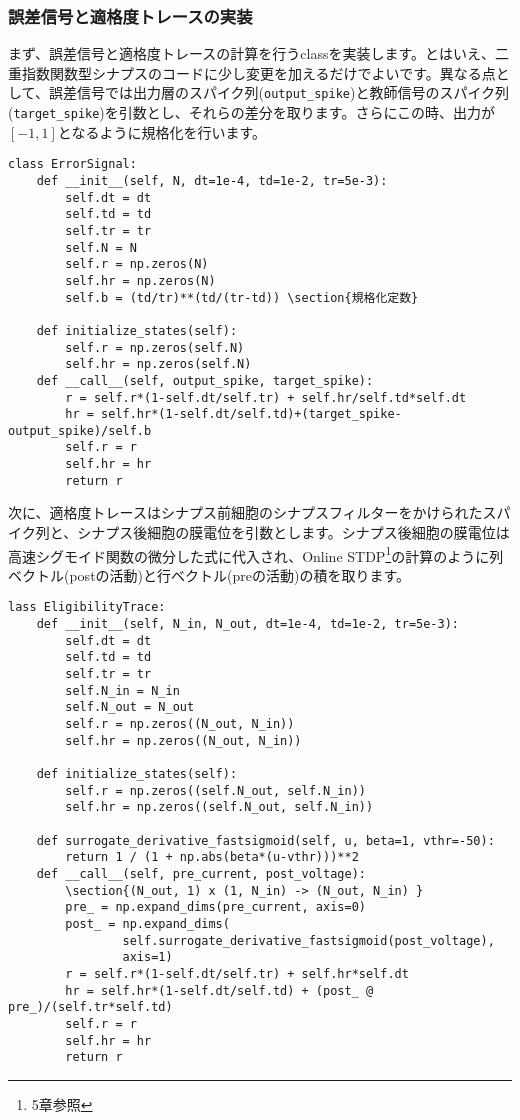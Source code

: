 \subsubsection{誤差信号と適格度トレースの実装}
まず、誤差信号と適格度トレースの計算を行うclassを実装します。とはいえ、二重指数関数型シナプスのコードに少し変更を加えるだけでよいです。異なる点として、誤差信号では出力層のスパイク列(\texttt{output\_spike})と教師信号のスパイク列(\texttt{target\_spike})を引数とし、それらの差分を取ります。さらにこの時、出力が$[-1, 1]$となるように規格化を行います。
\begin{verbatim}
class ErrorSignal:
    def __init__(self, N, dt=1e-4, td=1e-2, tr=5e-3):
        self.dt = dt
        self.td = td
        self.tr = tr
        self.N = N
        self.r = np.zeros(N)
        self.hr = np.zeros(N)
        self.b = (td/tr)**(td/(tr-td)) \section{規格化定数}
    
    def initialize_states(self):
        self.r = np.zeros(self.N)
        self.hr = np.zeros(self.N)    
    def __call__(self, output_spike, target_spike):
        r = self.r*(1-self.dt/self.tr) + self.hr/self.td*self.dt 
        hr = self.hr*(1-self.dt/self.td)+(target_spike-output_spike)/self.b
        self.r = r
        self.hr = hr
        return r
\end{verbatim}
次に、適格度トレースはシナプス前細胞のシナプスフィルターをかけられたスパイク列と、シナプス後細胞の膜電位を引数とします。シナプス後細胞の膜電位は高速シグモイド関数の微分した式に代入され、Online STDP\footnote{5章参照}の計算のように列ベクトル(postの活動)と行ベクトル(preの活動)の積を取ります。
\begin{verbatim}
lass EligibilityTrace:
    def __init__(self, N_in, N_out, dt=1e-4, td=1e-2, tr=5e-3):
        self.dt = dt
        self.td = td
        self.tr = tr
        self.N_in = N_in
        self.N_out = N_out
        self.r = np.zeros((N_out, N_in))
        self.hr = np.zeros((N_out, N_in))
    
    def initialize_states(self):
        self.r = np.zeros((self.N_out, self.N_in))
        self.hr = np.zeros((self.N_out, self.N_in))
    
    def surrogate_derivative_fastsigmoid(self, u, beta=1, vthr=-50):
        return 1 / (1 + np.abs(beta*(u-vthr)))**2
    def __call__(self, pre_current, post_voltage):
        \section{(N_out, 1) x (1, N_in) -> (N_out, N_in) }
        pre_ = np.expand_dims(pre_current, axis=0)
        post_ = np.expand_dims(
                self.surrogate_derivative_fastsigmoid(post_voltage), 
                axis=1)
        r = self.r*(1-self.dt/self.tr) + self.hr*self.dt 
        hr = self.hr*(1-self.dt/self.td) + (post_ @ pre_)/(self.tr*self.td)
        self.r = r
        self.hr = hr
        return r
\end{verbatim}
